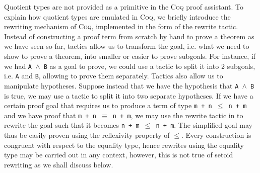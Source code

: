 \documentclass[12pt,twoside,maitrise]{dms}
\theoremstyle{definition}
\numberwithin{equation}{section}
\numberwithin{table}{chapter}
\numberwithin{figure}{chapter}
\newcommand\kw[1] {\textsf{#1}}
\newcommand\id[1] {\texttt{#1}}
\newcommand\fn[1] {\texttt{#1}}
\def\Coq{\textsc{Coq}\xspace}
\begin{document}
Quotient types are not provided as a primitive in the \Coq{} proof assistant.
To explain how quotient types are emulated in \Coq{}, we briefly introduce the
rewriting mechanism of \Coq{}, implemented in the form of the \kw{rewrite}
tactic. Instead of constructing a proof term from scratch by hand to prove a
theorem as we have seen so far, tactics allow us to transform the goal, i.e.
what we need to show to prove a theorem, into smaller or easier to prove
subgoals. For instance, if we had \fn{A $\wedge$ B} as a goal to prove, we
could use a tactic to split it into 2 subgoals, i.e. \id{A} and \id{B},
allowing to prove them separately. Tactics also allow us to manipulate
hypotheses. Suppose instead that we have the hypothesis that \fn{A $\wedge$ B}
is true, we may use a tactic to split it into two separate hypotheses. If we
have a certain proof goal that requires us to produce a term of type \fn{m + n
$\le$ n + m} and we have proof that \fn{m + n $\equiv$ n + m}, we may use the
\kw{rewrite} tactic in to rewrite the goal such that it becomes \fn{n + m $\le$
n + m}. The simplified goal may thus be easily proven using the reflexivity
property of $\le$. Every construction is congruent with respect to the equality
type, hence rewrites using the equality type may be carried out in any context,
however, this is not true of setoid rewriting as we shall discuss below.
\end{document}
